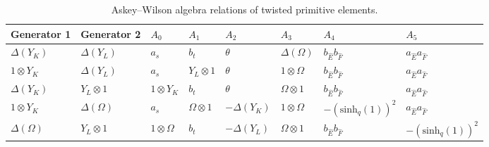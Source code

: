 \documentclass[pdftex]{sigma}
\numberwithin{equation}{section}
\newcommand{\dyone}{\Delta\left(Y_{L}\right)}
\newcommand{\dyzero}{\Delta\left(Y_{K}\right)}
\newcommand{\shq}{\mathrm{sinh}_q}
\newcommand{\yone}{Y_{L}\otimes 1}
\newcommand{\yzero}{1\otimes Y_{K}}
\begin{document}
\begin{table}[h]\centering \renewcommand{\arraystretch}{1.2}\small
	\begin{tabular}{|l|l|l|l|l|l|l|l|}
		\hline
		Generator 1 & Generator 2 & $A_0$ & $A_1$ & $A_2$ & $A_3$ & $A_4$ & $A_5$ \\ \hline
		$\dyzero$ & $\dyone$ & $a_s$ & $b_t$ & $\theta$ & $\Delta\left(\Omega\right)$ & $b_{\hat{E}}b_{\hat{F}}$ & $a_{\hat{E}}a_{\hat{F}}$ \\ \hline
		$\yzero$ & $\dyone$ & $a_s$ & $\yone$ & $\theta$ & $1\otimes\Omega$ & $b_{\hat{E}}b_{\hat{F}}$ & $a_{\hat{E}}a_{\hat{F}}$ \\ \hline
		$\dyzero$ & $\yone$ & $\yzero$ & $b_t$ & $\theta$ & $\Omega\otimes 1$ & $b_{\hat{E}}b_{\hat{F}}$ & $a_{\hat{E}}a_{\hat{F}}$ \\ \hline
		$\yzero$ & $\Delta\left(\Omega\right)$ & $a_s$ & $\Omega\otimes 1$ & $-\dyzero$ & $1\otimes\Omega$ & $-(\shq(1))^{2}$ &$a_{\hat{E}}a_{\hat{F}}$ \\ \hline
		$\Delta\left(\Omega\right)$ & $\yone$ & $1\otimes\Omega$ & $b_t$ & $-\dyone$ & $\Omega\otimes 1$ & $ b_{\hat{E}}b_{\hat{F}}$ &$-(\shq(1))^{2}$ \\ \hline
	\end{tabular}
	\caption{Askey--Wilson algebra relations of twisted primitive elements.}\label{tab:tpegenapp}
\end{table}
\end{document}
